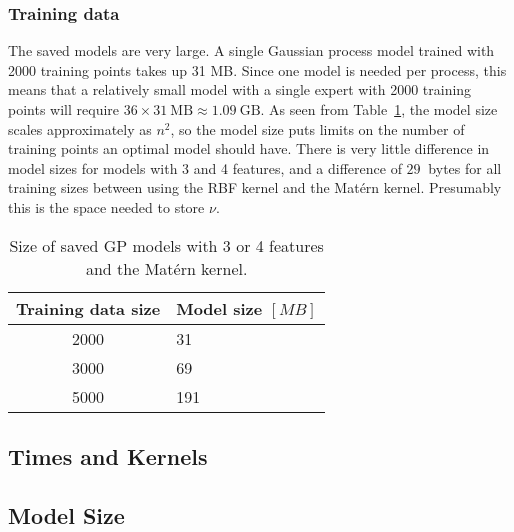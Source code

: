 \documentclass[twoside,english]{uiofysmaster}
\begin{document}
\subsubsection{Training data}

The saved models are very large. A single Gaussian process model trained with 2000 training points takes up 31 MB. Since one model is needed per process, this means that a relatively small model with a single expert with 2000 training points will require $36 \times 31~ \text{MB} \approx 1.09~\text{GB}$. As seen from Table~\ref{Tab:: results : model size vs training points}, the model size scales approximately as $n^2$, so the model size puts limits on the number of training points an optimal model should have. There is very little difference in model sizes for models with 3 and 4 features, and a difference of $29~$ bytes for all training sizes between using the RBF kernel and the Mat\'{e}rn kernel. Presumably this is the space needed to store $\nu$.

\begin{table}
\centering
\begin{tabular}{@{}cl@{}} \toprule
Training data size & Model size $[MB]$\\
\midrule
2000 & 31\\
3000 & 69\\
5000 & 191\\ \bottomrule
\end{tabular}
\caption{Size of saved GP models with 3 or 4 features and the Mat\'{e}rn kernel.}
\label{Tab:: results : model size vs training points}
\end{table}



\subsection{Times and Kernels}


\subsection{Model Size}
\end{document}
